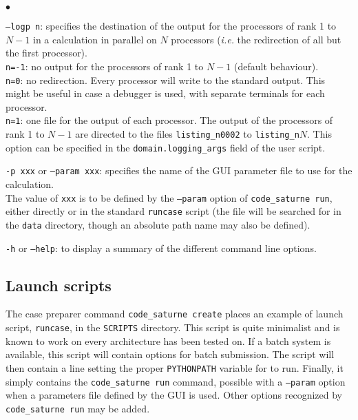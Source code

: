 {{{\begin{list}{$\bullet$}{}
\item \texttt{--logp n}: specifies the destination of the output for the
processors of rank 1 to $N-1$ in a calculation in parallel on $N$ processors
({\em i.e.} the redirection of all but the first processor).\\
\hspace*{0.5cm}\texttt{n=-1}: no output for the processors of rank 1 to $N-1$
(default behaviour).\\
\hspace*{0.5cm}\texttt{n=0}: no redirection. Every processor will write to the
standard output. This might be useful in case a debugger is used, with separate
terminals for each processor.\\
\hspace*{0.5cm}\texttt{n=1}: one file for the output of each processor. The
output of the processors of rank 1 to $N-1$ are directed to the files
\texttt{listing\_n0002} to \texttt{listing\_n$N$}.
This option can be specified in the \texttt{domain.logging\_args} field
of the user script.

\item \texttt{-p xxx} or \texttt{--param xxx}: specifies the name of the GUI
parameter file to use for the calculation.\\
The value of \texttt{xxx} is to be defined by the \texttt{--param} option
of \texttt{code\_saturne run}, either directly or in the standard \texttt{runcase}
script (the file will be searched for in the \texttt{data} directory, though
an absolute path name may also be defined).

\item \texttt{-h} or \texttt{--help}: to display a summary of the different
command line options.
\end{list}

\subsection{Launch scripts}
\label{prg_runcase}%

The case preparer command \texttt{code\_saturne~create} places an example of launch script,
\texttt{runcase}, in the \texttt{SCRIPTS} directory. This script is quite minimalist and is known to work on every architecture \CS has been tested on.
If a batch system is available, this script will contain options
for batch submission.
The script will then contain a line setting the proper \texttt{PYTHONPATH}
variable for \CS to run.
Finally, it simply contains the \texttt{code\_saturne run}  command,
possible with a \texttt{--param} option when a parameters file
defined by the GUI is used. Other options recognized by
\texttt{code\_saturne run} may be added.

}}}

